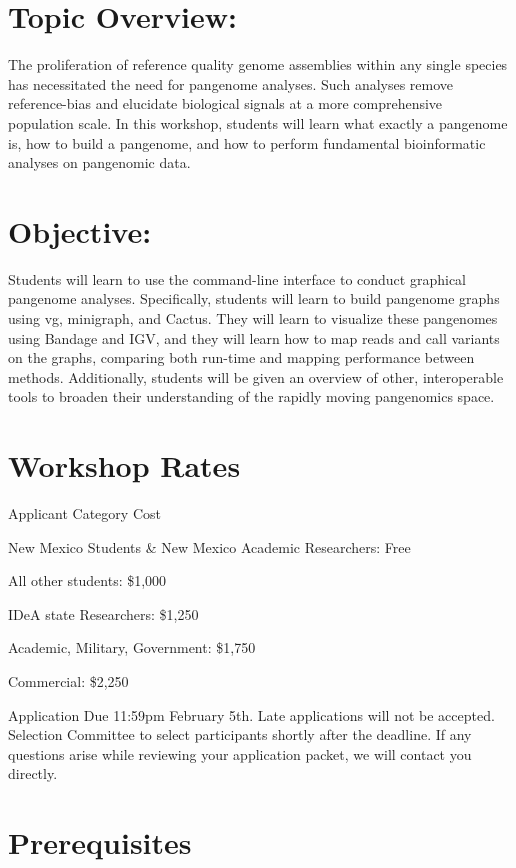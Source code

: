 \documentclass[
]{book}
\begin{document}
\hypertarget{topic-overview}{%
\section{Topic Overview:}\label{topic-overview}}

The proliferation of reference quality genome assemblies within any single species has necessitated the need for pangenome analyses. Such analyses remove reference-bias and elucidate biological signals at a more comprehensive population scale. In this workshop, students will learn what exactly a pangenome is, how to build a pangenome, and how to perform fundamental bioinformatic analyses on pangenomic data.

\hypertarget{objective}{%
\section{Objective:}\label{objective}}

Students will learn to use the command-line interface to conduct graphical pangenome analyses. Specifically, students will learn to build pangenome graphs using vg, minigraph, and Cactus. They will learn to visualize these pangenomes using Bandage and IGV, and they will learn how to map reads and call variants on the graphs, comparing both run-time and mapping performance between methods. Additionally, students will be given an overview of other, interoperable tools to broaden their understanding of the rapidly moving pangenomics space.

\hypertarget{workshop-rates}{%
\section{Workshop Rates}\label{workshop-rates}}

Applicant Category Cost

New Mexico Students \& New Mexico Academic Researchers:
Free

All other students:
\$1,000

IDeA state Researchers:
\$1,250

Academic, Military, Government:
\$1,750

Commercial:
\$2,250

Application Due 11:59pm February 5th. Late applications will not be accepted. Selection Committee to select participants shortly after the deadline. If any questions arise while reviewing your application packet, we will contact you directly.

\hypertarget{prerequisites}{%
\section{Prerequisites}\label{prerequisites}}
\end{document}
